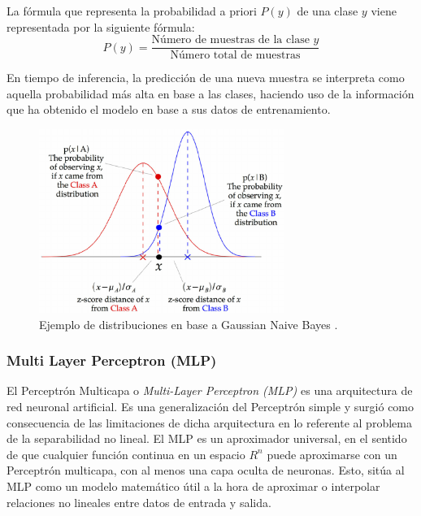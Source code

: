 \documentclass{uathesis-es}
\begin{document}
	La fórmula que representa la probabilidad a priori $P(y)$ de una clase $y$ viene representada por la siguiente fórmula:\\
	
	\[
	P(y) = \frac{\text{Número de muestras de la clase } y}{\text{Número total de muestras}}
	\]
	
	
	
	En tiempo de inferencia, la predicción de una nueva muestra se interpreta como aquella probabilidad más alta en base a las clases, haciendo uso de la información que ha obtenido el modelo en base a sus datos de entrenamiento.
	
	
	\begin{figure}[H]
		\centering
		\includegraphics[width=8cm]{Figures/Background/GNB.png}
		\caption{Ejemplo de distribuciones en base a Gaussian Naive Bayes \cite{GNBIMAGE}.}
		\label{GNB_BACKGROUND}
	\end{figure}
	
	
	\subsubsection*{Multi Layer Perceptron (MLP)}
	
	
	
	
	El Perceptrón Multicapa o \textit{Multi-Layer Perceptron (MLP)} es una arquitectura de red neuronal artificial. Es una generalización del Perceptrón simple y surgió como consecuencia de las limitaciones de dicha arquitectura en lo referente al problema de la separabilidad no lineal. El MLP es un aproximador universal, en el sentido de que cualquier función continua en un espacio $R^n$ puede aproximarse con un Perceptrón multicapa, con al menos una capa oculta de neuronas. Esto, sitúa al MLP como un modelo matemático útil a la hora de aproximar o interpolar relaciones no lineales entre datos de entrada y salida.
	
\end{document}
